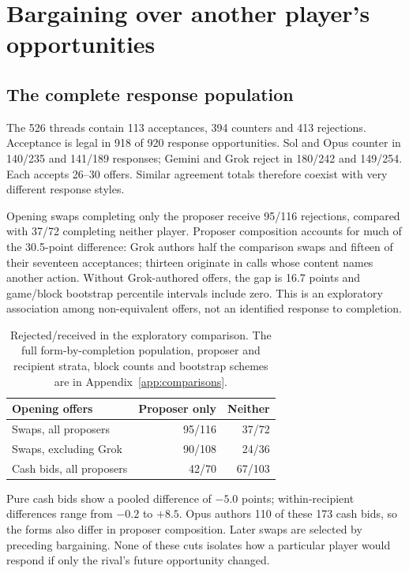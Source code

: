 \section{Bargaining over another player's opportunities}
\label{sec:bargaining}
\subsection{The complete response population}
The 526 threads contain 113 acceptances, 394 counters and 413 rejections. Acceptance is legal in 918 of 920 response opportunities. Sol and Opus counter in 140/235 and 141/189 responses; Gemini and Grok reject in 180/242 and 149/254. Each accepts 26--30 offers. Similar agreement totals therefore coexist with very different response styles.

Opening swaps completing only the proposer receive 95/116 rejections, compared with 37/72 completing neither player. Proposer composition accounts for much of the 30.5-point difference: Grok authors half the comparison swaps and fifteen of their seventeen acceptances; thirteen originate in calls whose content names another action. Without Grok-authored offers, the gap is 16.7 points and game/block bootstrap percentile intervals include zero. This is an exploratory association among non-equivalent offers, not an identified response to completion.

\begin{table}[t]\centering\small
\begin{tabular}{@{}lrr@{}}\toprule
Opening offers & Proposer only & Neither\\\midrule
Swaps, all proposers &95/116&37/72\\
Swaps, excluding Grok &90/108&24/36\\
Cash bids, all proposers &42/70&67/103\\\bottomrule
\end{tabular}
\caption{Rejected/received in the exploratory comparison. The full form-by-completion population, proposer and recipient strata, block counts and bootstrap schemes are in Appendix~\ref{app:comparisons}.}
\end{table}

Pure cash bids show a pooled difference of $-5.0$ points; within-recipient differences range from $-0.2$ to $+8.5$. Opus authors 110 of these 173 cash bids, so the forms also differ in proposer composition. Later swaps are selected by preceding bargaining. None of these cuts isolates how a particular player would respond if only the rival's future opportunity changed.

